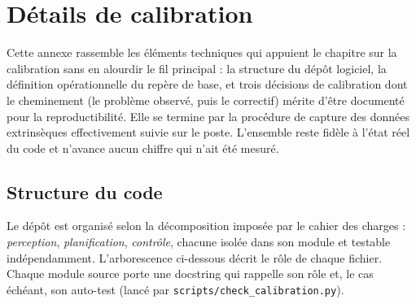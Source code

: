 \chapter{Détails de calibration}
\label{ann:calibration}

Cette annexe rassemble les éléments techniques qui appuient le chapitre sur
la calibration sans en alourdir le fil principal : la structure du dépôt
logiciel, la définition opérationnelle du repère de base, et trois décisions
de calibration dont le cheminement (le problème observé, puis le correctif)
mérite d'être documenté pour la reproductibilité. Elle se termine par la
procédure de capture des données extrinsèques effectivement suivie sur le
poste. L'ensemble reste fidèle à l'état réel du code et n'avance aucun chiffre
qui n'ait été mesuré.

\section{Structure du code}
\label{ann:code_structure}

Le dépôt est organisé selon la décomposition imposée par le cahier des
charges : \emph{perception}, \emph{planification}, \emph{contrôle}, chacune
isolée dans son module et testable indépendamment. L'arborescence ci-dessous
décrit le rôle de chaque fichier. Chaque module source porte une docstring qui
rappelle son rôle et, le cas échéant, son auto-test (lancé par
\texttt{scripts/check\_calibration.py}).

